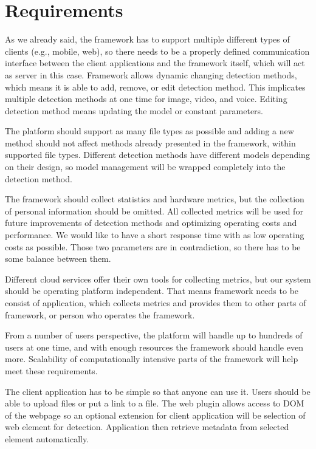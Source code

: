 \section{Requirements}

As we already said, the framework has to support multiple different types of clients (e.g., mobile, web), so there needs to be a properly defined communication interface between the client applications and the framework itself, which will act as server in this case. Framework allows dynamic changing detection methods, which means it is able to add, remove, or edit detection method. This implicates multiple detection methods at one time for image, video, and voice. Editing detection method means updating the model or constant parameters. 

The platform should support as many file types as possible and adding a new method should not affect methods already presented in the framework, within supported file types. Different detection methods have different models depending on their design, so model management will be wrapped completely into the detection method.

The framework should collect statistics and hardware metrics, but the collection of personal information should be omitted. All collected metrics will be used for future improvements of detection methods and optimizing operating costs and performance. We would like to have a short response time with as low operating costs as possible. Those two parameters are in contradiction, so there has to be some balance between them. 

Different cloud services offer their own tools for collecting metrics, but our system should be operating platform independent. That means framework needs to be consist of application, which collects metrics and provides them to other parts of framework, or person who operates the framework.

From a number of users perspective, the platform will handle up to hundreds of users at one time, and with enough resources the framework should handle even more. Scalability of computationally intensive parts of the framework will help meet these requirements. 

The client application has to be simple so that anyone can use it. Users should be able to upload files or put a link to a file. The web plugin allows access to DOM of the webpage so an optional extension for client application will be selection of web element for detection. Application then retrieve metadata from selected element automatically. 

